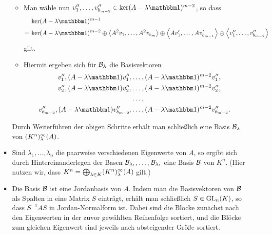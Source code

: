 \begin{itemize}[resume]
\begin{itemize}
\begin{align*}
        \end{align*}
      \item
        Man wähle nun $v''_1, \dotsc, v''_{b_{m-2}} \in \ker (A - \lambda \Id)^{m-2}$, so dass
        \begin{align*}
           &\,      \ker (A - \lambda \Id)^{m-1}  \\
          =&\,      \ker (A - \lambda \Id)^{m-2}
            \oplus  \generated{ A^2 v_1, \dotsc, A^2 v_{b_m} }
            \oplus  \generated{ A v'_1, \dotsc, A v'_{b_{m-1}} }
            \oplus  \generated{ v''_1, \dotsc, v''_{b_{m-2}} }
        \end{align*}
        gilt.
      \item
        Hiermit ergeben sich für $\mathcal{B}_\lambda$ die Basisvektoren
        \begin{align*}
          v''_1,         (A - \lambda \Id) v''_1,         &\dotsc, (A - \lambda \Id)^{m-2} v''_1,         \\
          v''_2,         (A - \lambda \Id) v''_2,         &\dotsc, (A - \lambda \Id)^{m-2} v''_2,         \\
                                          &\dotsc,                        \\
          v''_{b_{m-2}}, (A - \lambda \Id) v''_{b_{m-2}}, &\dotsc, (A - \lambda \Id)^{m-2} v''_{b_{m-2}}.
        \end{align*}
    \end{itemize}
    Durch Weiterführen der obigen Schritte erhält man schließlich eine Basis $\mathcal{B}_\lambda$ von $(K^n)_{\lambda}^{\infty}(A)$.
    
  \item
    Sind $\lambda_1, \dotsc, \lambda_n$ die paarweise verschiedenen Eigenwerte von $A$, so ergibt sich durch Hintereinanderlegen der Basen $\mathcal{B}_{\lambda_1}, \dotsc, \mathcal{B}_{\lambda_t}$ eine Basis $\mathcal{B}$ von $K^n$.
    (Hier nutzen wir, dass $K^n = \bigoplus_{\lambda \in K} (K^n)_{\lambda}^{\infty}(A)$ gilt.)
 
  \item
    Die Basis $\mathcal{B}$ ist eine Jordanbasis von $A$.
    Indem man die Basisvektoren von $\mathcal{B}$ als Spalten in eine Matrix $S$ einträgt, erhält man schließlich $S \in \operatorname{GL}_{n}(K)$, so dass $S^{-1} A S$ in Jordan-Normalform ist.
    Dabei sind die Blöcke zunächst nach den Eigenwerten in der zuvor gewählten Reihenfolge sortiert, und die Blöcke zum gleichen Eigenwert sind jeweils nach absteigender Größe sortiert.
\end{itemize}

